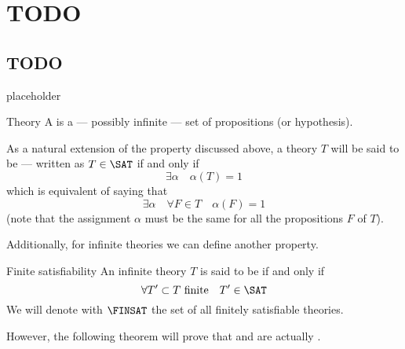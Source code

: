 \documentclass[a4paper, 12pt]{report}
\institute{\curlyquotes{\hspace{0.25mm}Sapienza} Università di Roma}
\subtitle{Appunti integrati con il libro \book}
\author{\textit{Autore}\\\authorName}
\institute{\curlyquotes{\hspace{0.25mm}Sapienza} University of Rome}
\subtitle{Lecture notes integrated with the book \book}
\author{\textit{Author}\\\authorName}
\title{\courseName}
\date{\today}
\begin{document}
    \maketitle

    {
        \hypersetup{allcolors=black}

        \romantableofcontents
    }

    \introduction


    \chapter{TODO}

    \section{TODO}

    placeholder 
    
    \begin{frameddefn}{Theory}
        A  is a --- possibly infinite --- set of propositions (or hypothesis).
    \end{frameddefn}

    As a natural extension of the  property discussed above, a theory $T$ will be said to be  --- written as $T \in \SAT$ if and only if $$\exists \alpha \quad \alpha(T) = 1$$ which is equivalent of saying that $$\exists \alpha \quad \forall F \in T \quad \alpha (F) = 1$$ (note that the assignment $\alpha$ must be the same for all the propositions $F$ of $T$).

    Additionally, for infinite theories we can define another property.

    \begin{frameddefn}{Finite satisfiability}
        An infinite theory $T$ is said to be  if and only if $$\forall T' \subset T \ \mathrm{finite} \quad T' \in \SAT$$ We will denote with $\FINSAT$ the set of all finitely satisfiable theories.
    \end{frameddefn}
    
    However, the following theorem will prove that  and  are actually .
\end{document}
